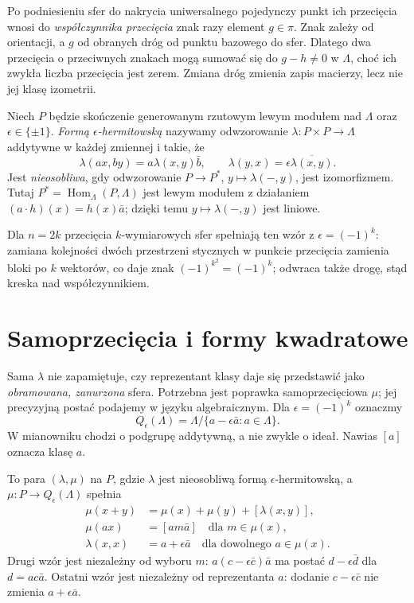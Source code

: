 Po podniesieniu sfer do nakrycia uniwersalnego
pojedynczy punkt ich przecięcia wnosi do
\emph{współczynnika przecięcia} znak razy element $g\in\pi$.
Znak zależy od orientacji, a $g$ od obranych dróg
od punktu bazowego do sfer. Dlatego dwa przecięcia
o przeciwnych znakach mogą sumować się do
$g-h\ne0$ w $\Lambda$, choć ich zwykła liczba
przecięcia jest zerem. Zmiana dróg zmienia zapis
macierzy, lecz nie jej klasę izometrii.

\begin{definicja}
\label{def:hermitowska-22}
Niech $P$ będzie skończenie generowanym rzutowym
lewym modułem
nad $\Lambda$ oraz $\epsilon\in\{\pm1\}$.
\emph{Formą $\epsilon$-hermitowską} nazywamy
odwzorowanie $\lambda:P\times P\to\Lambda$
addytywne w każdej zmiennej i takie, że
\[
 \lambda(ax,by)=a\lambda(x,y)\bar b,\qquad
 \lambda(y,x)=\epsilon\overline{\lambda(x,y)}.
\]
Jest \emph{nieosobliwa}, gdy odwzorowanie
$P\to P^*$, $y\mapsto\lambda(-,y)$, jest
izomorfizmem. Tutaj
$P^*=\operatorname{Hom}_\Lambda(P,\Lambda)$
jest lewym modułem z działaniem
$(a\cdot h)(x)=h(x)\bar a$; dzięki temu
$y\mapsto\lambda(-,y)$ jest liniowe.
\end{definicja}

Dla $n=2k$ przecięcia $k$-wymiarowych sfer
spełniają ten wzór z $\epsilon=(-1)^k$:
zamiana kolejności dwóch przestrzeni stycznych
w punkcie przecięcia zamienia bloki po $k$ wektorów,
co daje znak $(-1)^{k^2}=(-1)^k$; odwraca także
drogę, stąd kreska nad współczynnikiem.

\section{Samoprzecięcia i formy kwadratowe}
\label{sec:kwadratowa-22}

Sama $\lambda$ nie zapamiętuje, czy reprezentant
klasy daje się przedstawić jako \emph{obramowana,
zanurzona} sfera. Potrzebna jest poprawka
samoprzecięciowa $\mu$; jej precyzyjną postać
podajemy w języku algebraicznym. Dla
$\epsilon=(-1)^k$ oznaczmy
\[
 Q_\epsilon(\Lambda)=
 \Lambda/\{a-\epsilon\bar a:a\in\Lambda\}.
\]
W mianowniku chodzi o podgrupę addytywną, a nie
zwykle o ideał. Nawias $[a]$ oznacza klasę $a$.

\begin{definicja}
\label{def:forma-kwadratowa-22}
To para $(\lambda,\mu)$ na $P$, gdzie $\lambda$
jest nieosobliwą formą $\epsilon$-hermitowską, a
$\mu:P\to Q_\epsilon(\Lambda)$ spełnia
\begin{align}
 \mu(x+y)&=\mu(x)+\mu(y)+[\lambda(x,y)],
                   \label{eq:quad-add-22}\\
 \mu(ax)&=[a m\bar a]\quad\text{dla }m\in\mu(x),
                                                \label{eq:quad-scal-22}\\
 \lambda(x,x)&=a+\epsilon\bar a
       \quad\text{dla dowolnego }a\in\mu(x).
                   \label{eq:quad-diag-22}
\end{align}
Drugi wzór jest niezależny od wyboru $m$:
$a(c-\epsilon\bar c)\bar a$ ma postać
$d-\epsilon\bar d$ dla $d=ac\bar a$.
Ostatni wzór jest niezależny od reprezentanta
$a$: dodanie $c-\epsilon\bar c$ nie zmienia
$a+\epsilon\bar a$.
\end{definicja}


